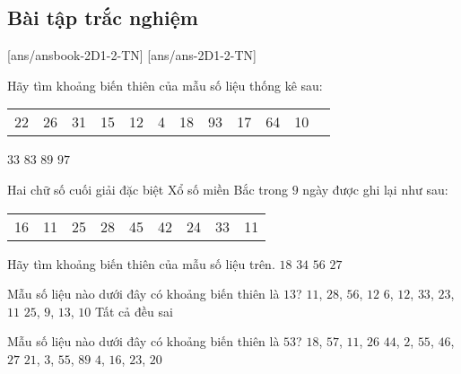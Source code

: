 \subsection{Bài tập trắc nghiệm}

[ans/ansbook-2D1-2-TN]
[ans/ans-2D1-2-TN]
	\begin{ex}%
	Hãy tìm khoảng biến thiên của mẫu số liệu thống kê sau:
	\begin{longtable}{cccccccccccc}
		22 & 26 & 31 & 15 & 12 & 4 & 18
		& 93 & 17 & 64 & 10
	\end{longtable}
	\choice
	{$33$}
	{$83$}
	{\True $89$}
	{$97$}
\end{ex}

\begin{ex}%
	Hai chữ số cuối giải đặc biệt Xổ số miền Bắc trong $9$ ngày được ghi lại như sau:
	\begin{longtable}{ccccccccc}
		16 & 11 & 25 & 28 & 45 & 42 & 24 & 33 & 11
	\end{longtable}
	Hãy tìm khoảng biến thiên của mẫu số liệu trên.
	\choice
	{$18$}
	{\True $34$}
	{$56$}
	{$27$}
\end{ex}

\begin{ex}%
	Mẫu số liệu nào dưới đây có khoảng biến thiên là $13$?
	\choice
	{$11$, $28$, $56$, $12$}
	{$6$, $12$, $33$, $23$, $11$}
	{$25$, $9$, $13$, $10$}
	{\True Tất cả đều sai}
\end{ex}

\begin{ex}%
	Mẫu số liệu nào dưới đây có khoảng biến thiên là $53$?
	\choice
	{$18$, $57$, $11$, $26$}
	{\True $44$, $2$, $55$, $46$, $27$}
	{$21$, $3$, $55$, $89$}
	{$4$, $16$, $23$, $20$}
\end{ex}

